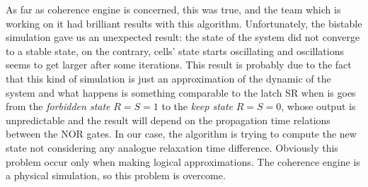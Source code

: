 As far as coherence engine is concerned, this was true, and the team which is working on it had brilliant results with this algorithm. Unfortunately, the bistable simulation gave us an unexpected result: the state of the system did not converge to a stable state, on the contrary, cells' state starts oscillating and oscillations seems to get larger after some iterations. This result is probably due to the fact that this kind of simulation is just an approximation of the dynamic of the system and what happens is something comparable to the latch SR when is goes from the \textit{forbidden state} $R=S=1$ to the \textit{keep state} $R=S=0$, whose output is unpredictable and the result will depend on the propagation time relations between the NOR gates. In our case, the algorithm is trying to compute the new state not considering any analogue relaxation time difference. Obviously this problem occur only when making logical approximations. The coherence engine is a physical simulation, so this problem is overcome.

